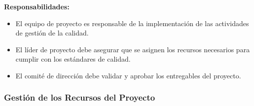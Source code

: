 \begin{multicols}{2}
\textbf{Responsabilidades:}
\begin{itemize}
    \item El equipo de proyecto es responsable de la implementación de las actividades de gestión de la calidad.
    \item El líder de proyecto debe asegurar que se asignen los recursos necesarios para cumplir con los estándares de calidad.
    \item El comité de dirección debe validar y aprobar los entregables del proyecto.
\end{itemize}
      \end{multicols}

      \subsubsection{Gestión de los Recursos del Proyecto}

